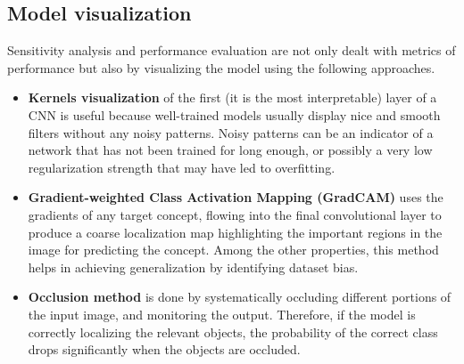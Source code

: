 \subsection{Model visualization}
Sensitivity analysis and performance evaluation are not only dealt with metrics of performance but also by visualizing the model using the following approaches.
\begin{itemize}
	\item \textbf{Kernels visualization} of the first (it is the most interpretable) layer of a CNN is useful because well-trained models usually display nice and smooth filters without any noisy patterns. Noisy patterns can be an indicator of a network that has not been trained for long enough, or possibly a very low regularization strength that may have led to overfitting.
	\vspace{-5pt}
	\item \textbf{Gradient-weighted Class Activation Mapping (GradCAM)} uses the gradients of any target concept, flowing into the final convolutional layer to produce a coarse localization map highlighting the important regions in the image for predicting the concept. Among the other properties, this method helps in achieving generalization by identifying dataset bias.
	\vspace{-5pt}
	\item \textbf{Occlusion method} is done by systematically occluding different portions of the input image, and monitoring the output. Therefore, if the model is correctly localizing the relevant objects, the probability of the correct class drops significantly when the objects are occluded.
\end{itemize}